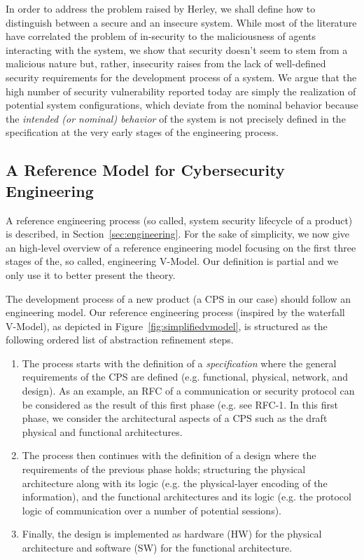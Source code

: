 In order to address the problem raised by Herley, we shall define how to
distinguish between a secure and an insecure system.  While most of the
literature have correlated the problem of in-security
to the maliciousness of agents interacting with the system, we show that
security doesn't seem to stem from a malicious nature but, rather, insecurity
raises from the lack of well-defined security requirements for the development
process of a system. We argue that the high number of security vulnerability
reported today are simply the realization of potential system configurations,
which deviate from the nominal behavior because the \emph{intended (or
nominal) behavior} of the system is not precisely defined in the specification
at the very early stages of the engineering process.   

\subsection{A Reference Model for Cybersecurity Engineering}\label{sec:vmodel}
A reference engineering process (so called, system security lifecycle of a
product) is described, in Section~\ref{sec:engineering}.  For the sake of
simplicity, we now give an high-level overview of a reference engineering model
focusing on the first three stages of the, so called, engineering V-Model. Our
definition is partial and we only use it  to
better present the theory.

The development process of a new product (a CPS in our case) 
should follow an engineering model. Our reference engineering process 
(inspired by the waterfall V-Model), as depicted in
Figure~\ref{fig:simplifiedvmodel}, is structured as the following ordered list
of abstraction refinement steps.
\begin{enumerate}
	\item The process starts with the definition of a \emph{specification}
		where the general requirements of the CPS are defined (e.g.
		functional, physical, network, and design).  As an example, an
		RFC of a communication or security protocol can be considered
		as the result of this first phase (e.g. see
		RFC-1\autocite{rfc1}.  In this first phase, we consider the
		architectural aspects of a CPS such as the draft physical and
		functional architectures.
	\item The process then continues with the definition of a design where
		the requirements of the previous phase holds; structuring the
		physical architecture along with its logic (e.g. the physical-layer encoding of the
		information), and the functional architectures and its logic (e.g. the protocol
		logic of communication over a number of potential sessions).
	\item Finally, the design is implemented as hardware (HW) for the physical architecture
		and software (SW) for the functional architecture.
\end{enumerate}

